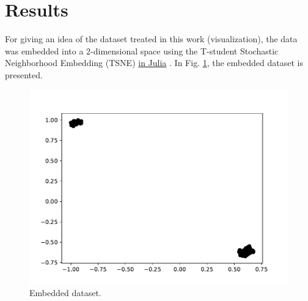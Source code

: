 \documentclass[conference]{IEEEtran}
\theoremstyle{definition}
\theoremstyle{remark}
\theoremstyle{remark}
\begin{document}
\section{Results}\label{sec:res}
For giving an idea of the dataset treated in this work (visualization), the data
was embedded into a 2-dimensional space using the T-student Stochastic
Neighborhood Embedding (TSNE) \href{https://github.com/lejon/TSne.jl}{in Julia}
\parencite{maaten2008}. In Fig. \ref{fig:emb_dat}, the embedded dataset is
presented.
\begin{figure}
  \includegraphics[width=\columnwidth]{figs/embedded-data.pdf}
  \caption{Embedded dataset.}
  \label{fig:emb_dat}
\end{figure}
\end{document}
